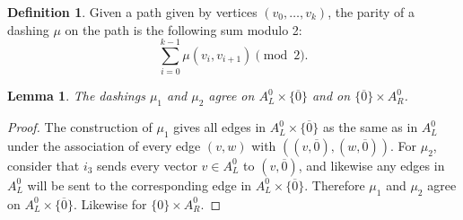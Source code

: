 \documentclass[12pt,twoside,singlespace]{article}
\numberwithin{equation}{section}
\newtheorem{lem}[equation]{Lemma}
\theoremstyle{definition}
\newtheorem{definition}[equation]{Definition}
\begin{document}
\begin{definition}
Given a path given by vertices $(v_0,\ldots,v_k)$, the parity of a dashing $\mu$ on the path is the following sum modulo 2:
\[\sum_{i=0}^{k-1} \mu(v_i,v_{i+1})\pmod{2}.\]
\end{definition}

\begin{lem}
The dashings $\mu_1$ and $\mu_2$ agree on $A_L^0\times \{\overline{0}\}$ and on $\{\overline{0}\}\times A_R^0$.
\end{lem}
\begin{proof}
The construction of $\mu_1$ gives all edges in $A_L^0\times\{\overline{0}\}$ as the same as in $A_L^0$ under the association of every edge $(v,w)$ with $((v,\overline{0}),(w,\overline{0}))$.  For $\mu_2$, consider that $i_3$ sends every vector $v\in A_L^0$ to $(v,\overline{0})$, and likewise any edges in $A_L^0$ will be sent to the corresponding edge in $A_L^0\times\{\overline{0}\}$.  Therefore $\mu_1$ and $\mu_2$ agree on $A_L^0\times\{\overline{0}\}$.  Likewise for $\{0\}\times A_R^0$.
\end{proof}
\end{document}
